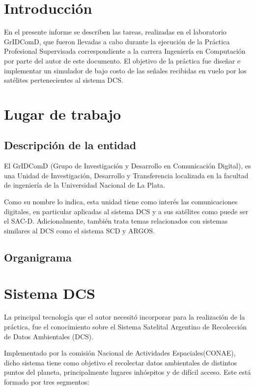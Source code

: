 \documentclass[a4paper,10pt]{article}
\begin{document}
\tableofcontents

\pagebreak
\setcounter{page}{1}
\section{Introducción}
En el presente informe se describen las tareas, realizadas en el laboratorio
GrIDComD, que fueron llevadas a cabo durante la ejecución de la Práctica Profesional
Supervisada correspondiente a la carrera Ingeniería en Computación por parte del autor de
este documento. El objetivo de la práctica fue diseñar e implementar un simulador de bajo costo
de las señales recibidas en vuelo por los satélites pertenecientes al sistema DCS.

\section{Lugar de trabajo}
\subsection{Descripción de la entidad}
El GrIDComD (Grupo de Investigación y Desarrollo en Comunicación Digital),  es una Unidad de Investigación, Desarrollo y Transferencia localizada en la facultad de ingeniería de la Universidad Nacional de La Plata.
\par
Como su nombre lo indica, esta unidad tiene como interés las comunicaciones digitales, en particular aplicadas al sistema DCS y a sus satélites como puede ser el SAC-D. Adicionalmente, también trata temas relacionados con sistemas similares al DCS como el sistema SCD y ARGOS.
\subsection{Organigrama}

\section{Sistema DCS}

La principal tecnología que el autor necesitó incorporar para la realización de la práctica, fue el conocimiento
sobre el Sistema Satelital Argentino de Recolección de Datos Ambientales (DCS). 
\par
Implementado por la comisión Nacional de Actividades Espaciales(CONAE), dicho sistema tiene como objetivo el
recolectar datos ambientales de distintos puntos del planeta, principalmente lugares inhóspitos y de difícil acceso. Este está formado
por tres segmentos:
\end{document}
